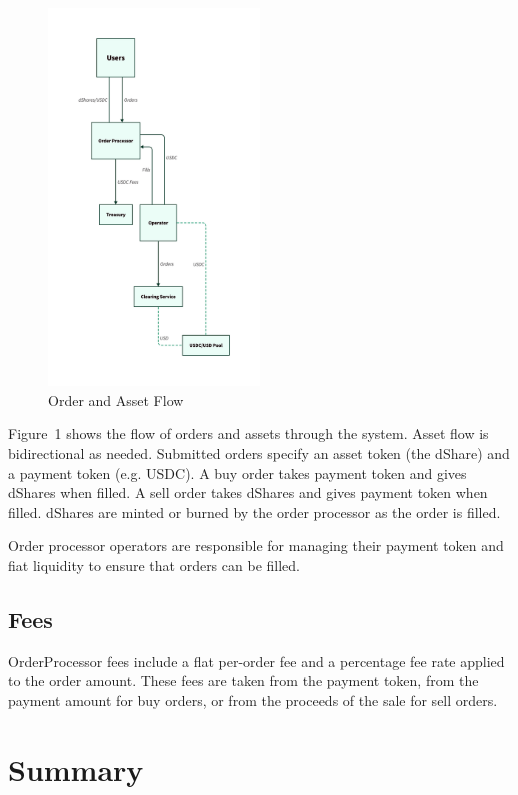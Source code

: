 \documentclass[sigconf,nonacm,prologue,table]{acmart}
\begin{document}
\begin{figure}
\centering
\includegraphics[width = 0.5\textwidth]{flow.d2}
\caption{Order and Asset Flow}
\label{fig:flow}
\end{figure}

Figure~1 shows the flow of orders and assets through the system. Asset flow is bidirectional as needed. Submitted orders specify an asset token (the dShare) and a payment token (e.g. USDC). A buy order takes payment token and gives dShares when filled. A sell order takes dShares and gives payment token when filled. dShares are minted or burned by the order processor as the order is filled. 

Order processor operators are responsible for managing their payment token and fiat liquidity to ensure that orders can be filled.

\subsection{Fees}

OrderProcessor fees include a flat per-order fee and a percentage fee rate applied to the order amount. These fees are taken from the payment token, from the payment amount for buy orders, or from the proceeds of the sale for sell orders.

\section{Summary}
\end{document}
